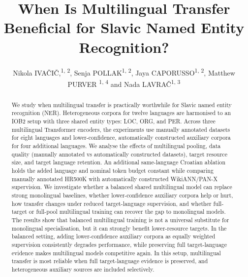 \documentclass{article}
\title{When Is Multilingual Transfer Beneficial for Slavic Named Entity Recognition?}
\author{
  Nikola IVAČIČ,\textsuperscript{1, 2}\orcidlink{0009-0008-8016-9530},
  Senja POLLAK\textsuperscript{1, 2}\orcidlink{0000-0002-4380-0863},
  Jaya CAPORUSSO\textsuperscript{1, 2}\orcidlink{0009-0007-8030-2840},
  Matthew PURVER \textsuperscript{1, 4}\orcidlink{0000-0003-2297-1273} and Nada LAVRAČ\textsuperscript{1, 3}\orcidlink{0000-0002-9995-7093}
}
\begin{document}
\maketitle

\begin{abstract}
We study when multilingual transfer is practically worthwhile for Slavic named entity recognition (NER). 
Heterogeneous corpora for twelve languages are harmonised to an IOB2 setup with three shared entity types: LOC, ORG, and PER. 
Across three multilingual Transformer encoders, the experiments use manually annotated datasets for eight languages and lower-confidence, automatically constructed auxiliary corpora for four additional languages.
We analyse the effects of multilingual pooling, data quality (manually annotated vs automatically constructed datasets), target resource size, and target language retention. 
An additional same-language Croatian ablation holds the added language and nominal token budget constant while comparing manually annotated HR500K with automatically constructed WikiANN/PAN-X supervision.
We investigate whether a balanced shared multilingual model can replace strong monolingual baselines, whether lower-confidence auxiliary corpora help or hurt, how transfer changes under reduced target-language supervision, and whether full-target or full-pool multilingual training can recover the gap to monolingual models. 
The results show that balanced multilingual training is not a universal substitute for monolingual specialisation, but it can strongly benefit lower-resource targets. 
In the balanced setting, adding lower-confidence auxiliary corpora as equally weighted supervision consistently degrades performance, while preserving full target-language evidence makes multilingual models competitive again.
In this setup, multilingual transfer is most reliable when full target-language evidence is preserved, and heterogeneous auxiliary sources are included selectively.
\end{abstract}
\break
\end{document}
